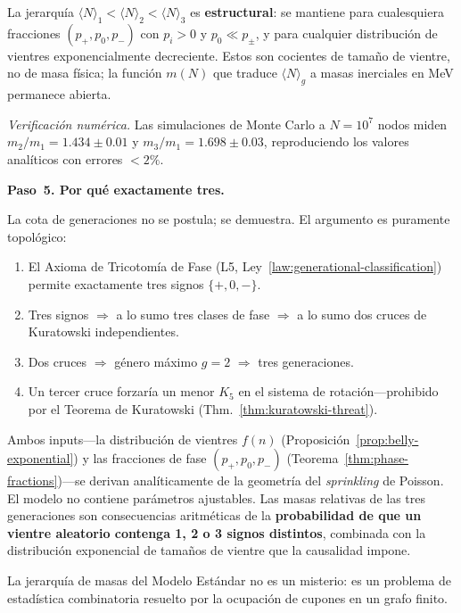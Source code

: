 \documentclass[11pt, a4paper, openany]{book}
\begin{document}
\noindent
La jerarqu\'ia $\langle N\rangle_1 < \langle N\rangle_2 <
\langle N\rangle_3$ es \textbf{estructural}: se mantiene para
cualesquiera fracciones $(p_+, p_0, p_-)$ con $p_i > 0$ y
$p_0 \ll p_\pm$, y para cualquier distribuci\'on de vientres
exponencialmente decreciente. Estos son cocientes de tama\~no de
vientre, no de masa f\'isica; la funci\'on $m(N)$ que traduce
$\langle N\rangle_g$ a masas inerciales en MeV permanece abierta.

\medskip
\noindent\textit{Verificaci\'on num\'erica.}\enspace
Las simulaciones de Monte Carlo a $N = 10^7$ nodos miden
$m_2/m_1 = 1{.}434 \pm 0{.}01$ y
$m_3/m_1 = 1{.}698 \pm 0{.}03$, reproduciendo los valores
anal\'iticos con errores $< 2\%$.

\bigskip
\noindent
\textbf{Paso~5. Por qu\'e exactamente tres.}

La cota de generaciones no se postula; se demuestra. El argumento es
puramente topol\'ogico:
\begin{enumerate}
  \item El Axioma de Tricotom\'ia de Fase
        (L5, Ley~\ref{law:generational-classification}) permite exactamente tres signos
        $\{+, 0, -\}$.
  \item Tres signos $\Longrightarrow$ a lo sumo tres clases de fase
        $\Longrightarrow$ a lo sumo dos cruces de Kuratowski
        independientes.
  \item Dos cruces $\Longrightarrow$ g\'enero m\'aximo $g = 2$
        $\Longrightarrow$ tres generaciones.
  \item Un tercer cruce forzar\'ia un menor $K_5$ en el sistema de
        rotaci\'on---prohibido por el Teorema de Kuratowski
        (Thm.~\ref{thm:kuratowski-threat}).
\end{enumerate}

\begin{result}[title={Inventario: cero par\'ametros libres}]
Ambos inputs---la distribuci\'on de vientres $f(n)$
(Proposici\'on~\ref{prop:belly-exponential}) y las fracciones de
fase $(p_+, p_0, p_-)$
(Teorema~\ref{thm:phase-fractions})---se derivan anal\'iticamente
de la geometr\'ia del \emph{sprinkling} de Poisson.
El modelo no contiene par\'ametros ajustables. Las masas relativas de
las tres generaciones son consecuencias aritm\'eticas de la
\textbf{probabilidad de que un vientre aleatorio contenga 1, 2 o 3
signos distintos}, combinada con la distribuci\'on exponencial de
tama\~nos de vientre que la causalidad impone.

La jerarqu\'ia de masas del Modelo Est\'andar no es un misterio: es un
problema de estad\'istica combinatoria resuelto por la ocupaci\'on de
cupones en un grafo finito.
\end{result}
\end{document}
